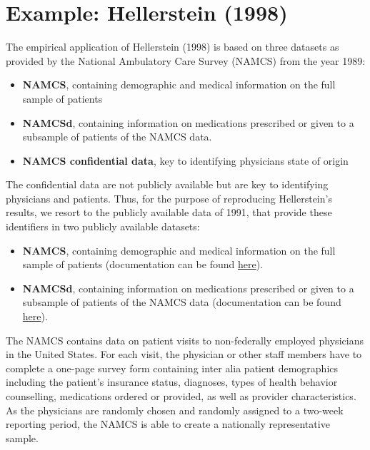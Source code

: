 \documentclass[
]{book}
\providecommand{\tightlist}{%
  \setlength{\itemsep}{0pt}\setlength{\parskip}{0pt}}
\begin{document}
\hypertarget{example-hellerstein-1998-2}{%
\section{Example: Hellerstein (1998)}\label{example-hellerstein-1998-2}}

The empirical application of Hellerstein (1998) is based on three
datasets as provided by the National Ambulatory Care Survey (NAMCS) from
the year 1989:

\begin{itemize}
\tightlist
\item
  \textbf{NAMCS}, containing demographic and medical information on the
  full sample of patients
\item
  \textbf{NAMCSd}, containing information on medications prescribed or
  given to a subsample of patients of the NAMCS data.
\item
  \textbf{NAMCS confidential data}, key to identifying physicians state
  of origin
\end{itemize}

The confidential data are not publicly available but are key to
identifying physicians and patients. Thus, for the purpose of
reproducing Hellerstein's results, we resort to the publicly available
data of 1991, that provide these identifiers in two publicly available
datasets:

\begin{itemize}
\tightlist
\item
  \textbf{NAMCS}, containing demographic and medical information on the
  full sample of patients (documentation can be found
  \href{https://www.cdc.gov/nchs/ahcd/datasets_documentation_related.htm}{here}).
\item
  \textbf{NAMCSd}, containing information on medications prescribed or
  given to a subsample of patients of the NAMCS data (documentation can
  be found
  \href{https://www.cdc.gov/nchs/ahcd/datasets_documentation_related.htm}{here}).
\end{itemize}

The NAMCS contains data on patient visits to non-federally employed
physicians in the United States. For each visit, the physician or other
staff members have to complete a one-page survey form containing inter
alia patient demographics including the patient's insurance status,
diagnoses, types of health behavior counselling, medications ordered or
provided, as well as provider characteristics. As the physicians are
randomly chosen and randomly assigned to a two-week reporting period,
the NAMCS is able to create a nationally representative sample.
\end{document}
